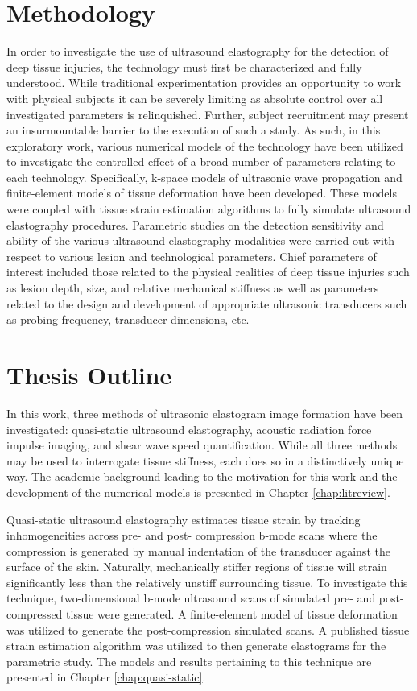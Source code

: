 	\section{Methodology}
		In order to investigate the use of ultrasound elastography for the detection of deep tissue injuries, the technology must first be characterized and fully understood. While traditional experimentation provides an opportunity to work with physical subjects it can be severely limiting as absolute control over all investigated parameters is relinquished. Further, subject recruitment may present an insurmountable barrier to the execution of such a study. As such, in this exploratory work, various numerical models of the technology have been utilized to investigate the controlled effect of a broad number of parameters relating to each technology. Specifically, k-space models of ultrasonic wave propagation and finite-element models of tissue deformation have been developed. These models were coupled with tissue strain estimation algorithms to fully simulate ultrasound elastography procedures. Parametric studies on the detection sensitivity and ability of the various ultrasound elastography modalities were carried out with respect to various lesion and technological parameters. Chief parameters of interest included those related to the physical realities of deep tissue injuries such as lesion depth, size, and relative mechanical stiffness as well as parameters related to the design and development of appropriate ultrasonic transducers such as probing frequency, transducer dimensions, etc.

	\section{Thesis Outline}
		In this work, three methods of ultrasonic elastogram image formation have been investigated: quasi-static ultrasound elastography, acoustic radiation force impulse imaging, and shear wave speed quantification. While all three methods may be used to interrogate tissue stiffness, each does so in a distinctively unique way. The academic background leading to the motivation for this work and the development of the numerical models is presented in Chapter \ref{chap:litreview}.

		Quasi-static ultrasound elastography estimates tissue strain by tracking inhomogeneities across pre- and post- compression b-mode scans where the compression is generated by manual indentation of the transducer against the surface of the skin. Naturally, mechanically stiffer regions of tissue will strain significantly less than the relatively unstiff surrounding tissue. To investigate this technique, two-dimensional b-mode ultrasound scans of simulated pre- and post-compressed tissue were generated. A finite-element model of tissue deformation was utilized to generate the post-compression simulated scans. A published tissue strain estimation algorithm was utilized to then generate elastograms for the parametric study. The models and results pertaining to this technique are presented in Chapter \ref{chap:quasi-static}.

